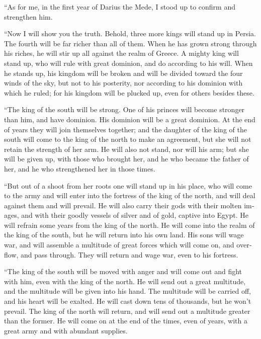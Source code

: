 \begin{paracol}{2}
\begin{otherlanguage}{english}
 ``As for me, in the first year of Darius the Mede, I
stood up to confirm and strengthen him.

 ``Now I will show you the truth. Behold, three more kings
will stand up in Persia. The fourth will be far richer than all of them.
When he has grown strong through his riches, he will stir up all against
the realm of Greece.  A mighty king will stand up, who
will rule with great dominion, and do according to his will.
 When he stands up, his kingdom will be broken and will be
divided toward the four winds of the sky, but not to his posterity, nor
according to his dominion with which he ruled; for his kingdom will be
plucked up, even for others besides these.

 ``The king of the south will be strong. One of his
princes will become stronger than him, and have dominion. His dominion
will be a great dominion.  At the end of years they will
join themselves together; and the daughter of the king of the south will
come to the king of the north to make an agreement, but she will not
retain the strength of her arm. He will also not stand, nor will his
arm; but she will be given up, with those who brought her, and he who
became the father of her, and he who strengthened her in those times.

 ``But out of a shoot from her roots one will stand up in
his place, who will come to the army and will enter into the fortress of
the king of the north, and will deal against them and will prevail.
 He will also carry their gods with their molten images,
and with their goodly vessels of silver and of gold, captive into Egypt.
He will refrain some years from the king of the north.  He
will come into the realm of the king of the south, but he will return
into his own land.  His sons will wage war, and will
assemble a multitude of great forces which will come on, and overflow,
and pass through. They will return and wage war, even to his fortress.

 ``The king of the south will be moved with anger and
will come out and fight with him, even with the king of the north. He
will send out a great multitude, and the multitude will be given into
his hand.  The multitude will be carried off, and his
heart will be exalted. He will cast down tens of thousands, but he won't
prevail.  The king of the north will return, and will
send out a multitude greater than the former. He will come on at the end
of the times, even of years, with a great army and with abundant
supplies.


\end{otherlanguage}
\end{paracol}
